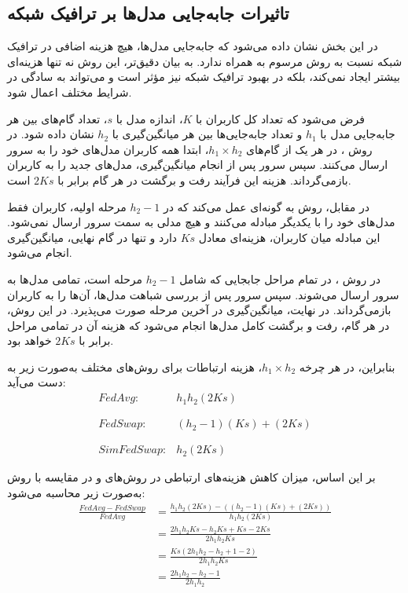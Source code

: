 \subsection{تاثیرات جابه‌جایی مدل‌ها بر ترافیک شبکه}
در این بخش نشان داده می‌شود که
جابه‌جایی مدل‌ها، هیچ هزینه اضافی در ترافیک شبکه نسبت به روش مرسوم  به همراه ندارد. به بیان دقیق‌تر، این روش نه تنها هزینه‌ای بیشتر ایجاد نمی‌کند، بلکه در بهبود ترافیک شبکه نیز مؤثر است و می‌تواند به سادگی در شرایط مختلف اعمال شود. 


فرض می‌شود که تعداد کل کاربران با \(K\)، اندازه مدل با \(s\)، تعداد گام‌های بین هر جابه‌جایی مدل با \(h_1\) و تعداد جابه‌جایی‌ها بین هر میانگین‌گیری با \(h_2\) نشان داده شود.
در روش ، در هر یک از گام‌های \( h_1 \times h_2 \)، ابتدا همه کاربران مدل‌های خود را به سرور ارسال می‌کنند. سپس سرور پس از انجام میانگین‌گیری، مدل‌های جدید را به کاربران بازمی‌گرداند. هزینه این فرآیند رفت و برگشت در هر گام برابر با \( 2Ks \) است.

در مقابل، روش  به گونه‌ای عمل می‌کند که در \( h_2 - 1 \) مرحله اولیه، کاربران فقط مدل‌های خود را با یکدیگر مبادله می‌کنند و هیچ مدلی به سمت سرور ارسال نمی‌شود. این مبادله میان کاربران، هزینه‌ای معادل \( Ks \) دارد و تنها در گام نهایی، میانگین‌گیری انجام می‌شود.

در روش ، در تمام مراحل جابجایی که شامل \( h_2 - 1 \) مرحله است، تمامی مدل‌ها به سرور ارسال می‌شوند. سپس سرور پس از بررسی شباهت مدل‌ها، آن‌ها را به کاربران بازمی‌گرداند. در نهایت، میانگین‌گیری در آخرین مرحله صورت می‌پذیرد. در این روش، در هر گام، رفت و برگشت کامل مدل‌ها انجام می‌شود که هزینه آن در تمامی مراحل برابر با \( 2Ks \) خواهد بود.

بنابراین، در هر چرخه \( h_1 \times h_2 \)، هزینه ارتباطات برای روش‌های مختلف به‌صورت زیر به دست می‌آید:
\begin{equation}
	\begin{array}{ll}
		FedAvg: & h_1h_2 (2Ks)
		\\ \\ \\
		FedSwap: & (h_2-1)(Ks) + (2Ks)
		\\ \\ \\
		SimFedSwap: & h_2(2Ks)
	\end{array}
\end{equation}


بر این اساس، میزان کاهش هزینه‌های ارتباطی در روش‌های  و  در مقایسه با روش  به‌صورت زیر محاسبه می‌شود:
\begingroup
\addtolength{\jot}{0.5em}
\begin{equation}
	\begin{aligned} 
		\frac{FedAvg-FedSwap}{FedAvg}
		&= \frac{h_1h_2(2Ks)-((h_2-1)(Ks)+(2Ks))}{h_1h_2(2Ks)} \\
		&= \frac{2h_1h_2Ks-h_2Ks+Ks-2Ks}{2h_1h_2Ks} \\
		&= \frac{Ks(2h_1h_2 -h_2 +1 -2)}{2h_1h_2Ks} \\
		&= \frac{2h_1h_2 -h_2 -1}{2h_1h_2}
	\end{aligned}
\end{equation}
\endgroup

